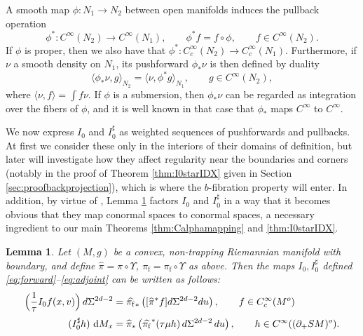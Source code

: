 \documentclass[JEP,XML,SOM,Unicode,NoFloatCountersInSection, NoEqCountersInSection,published]{cedram}
\theoremstyle{plain}
\newtheorem{Lemma}[Theorem]{Lemma}
\theoremstyle{definition}
\theoremstyle{remark}
\newcommand{\adj}{I_0^\sharp}
\newcommand{\hpi}{\widehat{\pi}}
\newcommand {\dM}{\mathrm{d}M}
\newcommand{\foot}{{\pi_{\mathrm f}}}
\newcommand{\hF}{\widehat{\foot}}
\begin{document}
 \label{sec:compounds}

A smooth map $\phi:N_1\to N_2$ between open manifolds induces the pullback operation
\begin{equation*}
\phi^*\colon C^\infty(N_2) \to C^\infty(N_1), \qquad \phi^* f = f\circ \phi, \qquad f\in C^\infty(N_2).
\end{equation*}
If $\phi$ is proper, then we also have that $\phi^*\colon C_c^{\infty}(N_2)\to C_c^{\infty}(N_1)$. Furthermore, if $\nu$ a smooth
density on $N_1$, its pushforward $\phi_*\nu$ is then defined by duality
\begin{equation*}
\langle \phi_* \nu, g \rangle_{N_2} = \langle \nu, \phi^* g \rangle_{N_1}, \qquad g\in C^\infty(N_2),
\end{equation*}
where $\langle \nu, f\rangle = \int f \nu$. If $\phi$ is a submersion, then $\phi_* \nu$ can be regarded
as integration over the fibers of $\phi$, and it is well known in that case that $\phi_*$ maps $C^\infty$ to $C^\infty$.

We now express $I_0$ and $\adj $ as weighted sequences of pushforwards and pullbacks. At first we consider these only in the interiors of their domains of definition, but later will investigate how they affect regularity near the boundaries and corners (notably in the proof of Theorem \ref{thm:I0starIDX} given in Section \ref{sec:proofbackprojection}), which is where the $b$-fibration property will enter. In addition, by virtue of \cite[Th.\,3 \& 5]{Melrose1992}, Lemma \ref{lem:Irewrite} factors $I_0$ and $\adj$ in a way that it becomes obvious that they map conormal spaces to conormal spaces, a necessary ingredient to our main Theorems \ref{thm:Calphamapping} and \ref{thm:I0starIDX}.

\begin{Lemma}\label{lem:Irewrite}
Let $(M,g)$ be a convex, non-trapping Riemannian manifold with boundary, and define $\hpi = \pi\circ\Upsilon$,
$\hF = \foot\circ\Upsilon$ as above.
Then the maps $I_0, \adj $ defined \eqref{eq:forward}--\eqref{eq:adjoint} can be written as follows:
\begin{align}
\Bigl(\frac{1}{\tau} I_0 f(x,v) \Bigr)\, d\Sigma^{2d-2} &= \hF_* \left([\hpi^* f]d\Sigma^{2d-2} du \right), \qquad f\in C_{c}^\infty(M^{o}) \label{eq:I0} \\[0.5ex]
(\adj h)\ \dM_x &= \hpi_* \left(\hF^* (\tau\mu h)\,d\Sigma^{2d-2}\,du\right), \qquad h\in C^\infty((\partial_+ SM)^{o}). \label{eq:I0star}
\end{align}
\end{Lemma}
\end{document}
